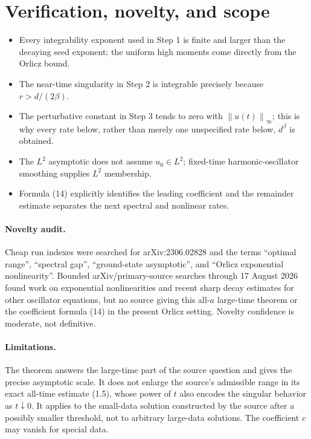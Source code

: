 \documentclass[11pt]{article}
\newcommand{\norm}[1]{\left\lVert #1\right\rVert}
\begin{document}
\section*{Verification, novelty, and scope}
\begin{itemize}
\item Every integrability exponent used in Step 1 is finite and larger than
the decaying seed exponent; the uniform high moments come directly from the
Orlicz bound.
\item The near-time singularity in Step 2 is integrable precisely because
\(r>d/(2\beta)\).
\item The perturbative constant in Step 3 tends to zero with
\(\norm{u(t)}_\infty\); this is why every rate below, rather than merely one
unspecified rate below, \(d^\beta\) is obtained.
\item The \(L^2\) asymptotic does not assume \(u_0\in L^2\); fixed-time
harmonic-oscillator smoothing supplies \(L^2\) membership.
\item Formula (14) explicitly identifies the leading coefficient and the
remainder estimate separates the next spectral and nonlinear rates.
\end{itemize}

\paragraph{Novelty audit.}
Cheap run indexes were searched for arXiv:2306.02828 and the terms
``optimal range'', ``spectral gap'', ``ground-state asymptotic'', and
``Orlicz exponential nonlinearity''.  Bounded arXiv/primary-source searches
through 17 August 2026 found work on exponential nonlinearities and recent
sharp decay estimates for other oscillator equations, but no source giving
this all-\(a\) large-time theorem or the coefficient formula (14) in the
present Orlicz setting.  Novelty confidence is moderate, not definitive.

\paragraph{Limitations.}
The theorem answers the large-time part of the source question and gives
the precise asymptotic scale.  It does not enlarge the source's admissible
range in its exact all-time estimate (1.5), whose power of \(t\) also
encodes the singular behavior as \(t\downarrow0\).  It applies to the
small-data solution constructed by the source after a possibly smaller
threshold, not to arbitrary large-data solutions.  The coefficient \(c\)
may vanish for special data.
\end{document}
